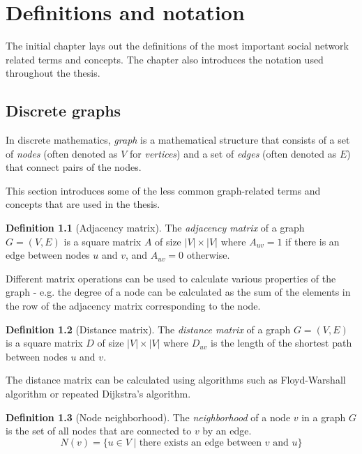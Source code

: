 \chapter{Definitions and notation}

The initial chapter lays out the definitions of the most important social network related terms and concepts. 
The chapter also introduces the notation used throughout the thesis.

\section{Discrete graphs}

In discrete mathematics, \textit{graph} is a mathematical structure that consists of a set of \textit{nodes} (often denoted as $V$ for \textit{vertices})
and a set of \textit{edges} (often denoted as $E$) that connect pairs of the nodes.

This section introduces some of the less common graph-related terms and concepts that are used in the thesis.

\theoremstyle{definition}
\newtheorem{definition}{Definition}[section]

\begin{definition}[Adjacency matrix]
    The \textit{adjacency matrix} of a graph $G = (V, E)$ is a square matrix $A$ of size $|V| \times |V|$ where $A_{uv} = 1$ if there is an edge between nodes $u$ and $v$, and $A_{uv} = 0$ otherwise.  

    Different matrix operations can be used to calculate various properties of the graph - e.g. the degree of a node can be calculated as the sum of the elements in the row of the adjacency matrix corresponding to the node.
\end{definition}

\begin{definition}[Distance matrix]
    The \textit{distance matrix} of a graph $G = (V, E)$ is a square matrix $D$ of size $|V| \times |V|$ where $D_{uv}$ is the length of the shortest path between nodes $u$ and $v$.

    The distance matrix can be calculated using algorithms such as Floyd-Warshall algorithm or repeated Dijkstra's algorithm.
\end{definition}

\begin{definition}[Node neighborhood]
    The \textit{neighborhood} of a node $v$ in a graph $G$ is the set of all nodes that are connected to $v$ by an edge.
    $$
    N(v) = \{ u \in V \mid \text{there exists an edge between $v$ and $u$} \}
    $$
\end{definition}

